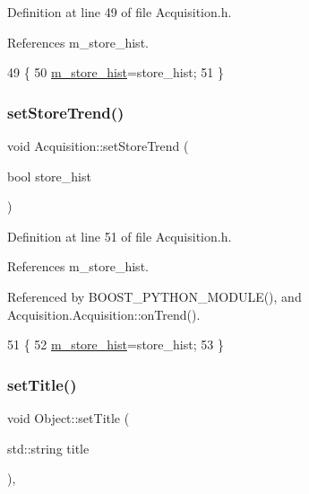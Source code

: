 Definition at line 49 of file Acquisition.\+h.



References m\+\_\+store\+\_\+hist.


\begin{DoxyCode}
49                                      \{
50     \hyperlink{classAcquisition_a08f70edd83751dbdab4c8190dc4b9188}{m\_store\_hist}=store\_hist;
51   \}
\end{DoxyCode}
\mbox{\label{classAcquisition_a1ceff272a1ad030dcd20c0dcddc65443}} 
\subsubsection{\texorpdfstring{set\+Store\+Trend()}{setStoreTrend()}\hspace{0.1cm}{\footnotesize\ttfamily [2/2]}}
{\footnotesize\ttfamily void Acquisition\+::set\+Store\+Trend (\begin{DoxyParamCaption}\item[{bool}]{store\+\_\+hist }\end{DoxyParamCaption})\hspace{0.3cm}{\ttfamily [inline]}}



Definition at line 51 of file Acquisition.\+h.



References m\+\_\+store\+\_\+hist.



Referenced by B\+O\+O\+S\+T\+\_\+\+P\+Y\+T\+H\+O\+N\+\_\+\+M\+O\+D\+U\+L\+E(), and Acquisition.\+Acquisition\+::on\+Trend().


\begin{DoxyCode}
51                                      \{
52     \hyperlink{classAcquisition_a08f70edd83751dbdab4c8190dc4b9188}{m\_store\_hist}=store\_hist;
53   \}
\end{DoxyCode}
\mbox{\label{classObject_a89557dbbad5bcaa02652f5d7fa35d20f}} 
\subsubsection{\texorpdfstring{set\+Title()}{setTitle()}}
{\footnotesize\ttfamily void Object\+::set\+Title (\begin{DoxyParamCaption}\item[{std\+::string}]{title }\end{DoxyParamCaption})\hspace{0.3cm}{\ttfamily [inline]}, {\ttfamily [inherited]}}



